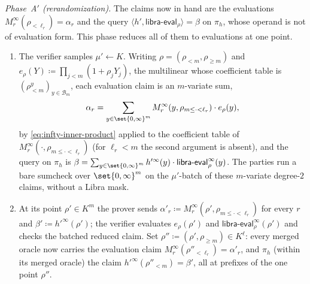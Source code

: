 \documentclass{article}
\theoremstyle{definition}
\newcommand{\BB}{\mathcal{B}}
\begin{document}
\begin{protocol}
\emph{Phase~A$'$ (rerandomization).} The claims now in hand are the evaluations $M_r^\infty(\rho_{< \ell_r}) = \alpha_r$ and the query $\langle h', \textsf{libra-eval}_\rho \rangle = \beta$ on $\pi_h$, whose operand is not of evaluation form. This phase reduces all of them to evaluations at one point.
\begin{enumerate}
\item The verifier samples $\mu' \gets K$. Writing $\rho = (\rho_{< m}, \rho_{\ge m})$ and $e_\rho(Y) \coloneqq \prod_{j < m} (1 + \rho_j Y_j)$, the multilinear whose coefficient table is $(\rho_{< m}^y)_{y \in \BB_m}$, each evaluation claim is an $m$-variate sum,
\[
  \alpha_r = \sum_{y \in \set{0, \infty}^m} M_r^\infty(y, \rho_{m \le \cdot < \ell_r}) \cdot e_\rho(y),
\]
by \eqref{eq:infty-inner-product} applied to the coefficient table of $M_r^\infty(\cdot, \rho_{m \le \cdot < \ell_r})$ (for $\ell_r < m$ the second argument is absent), and the query on $\pi_h$ is $\beta = \sum_{y \in \set{0, \infty}^m} h'^\infty(y) \cdot \textsf{libra-eval}_\rho^\infty(y)$. The parties run a bare sumcheck over $\set{0, \infty}^m$ on the $\mu'$-batch of these $m$-variate degree-$2$ claims, without a Libra mask.
\item At its point $\rho' \in K^m$ the prover sends $\alpha'_r \coloneqq M_r^\infty(\rho', \rho_{m \le \cdot < \ell_r})$ for every $r$ and $\beta' \coloneqq h'^\infty(\rho')$; the verifier evaluates $e_\rho(\rho')$ and $\textsf{libra-eval}_\rho^\infty(\rho')$ and checks the batched reduced claim. Set $\rho'' \coloneqq (\rho', \rho_{\ge m}) \in K^{\boldsymbol{\ell}}$: every merged oracle now carries the evaluation claim $M_r^\infty(\rho''_{< \ell_r}) = \alpha'_r$, and $\pi_h$ (within its merged oracle) the claim $h'^\infty(\rho''_{< m}) = \beta'$, all at prefixes of the one point $\rho''$.
\end{enumerate}


\end{protocol}
\end{document}
